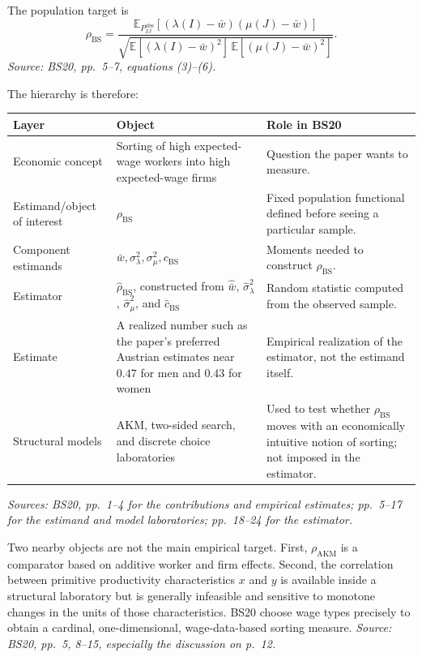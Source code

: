 \documentclass[11pt]{article}
\begin{document}
The population target is
\[
\rho_{\mathrm{BS}}
=
\frac{
\mathbb E_{P^{\mathrm{obs}}_{IJ}}
[(\lambda(I)-\bar w)(\mu(J)-\bar w)]
}{
\sqrt{
\mathbb E[(\lambda(I)-\bar w)^2]\,
\mathbb E[(\mu(J)-\bar w)^2]
}
}.
\tag{T2.3}
\]
\textit{Source: BS20, pp.\ 5--7, equations (3)--(6).}

The hierarchy is therefore:

\begin{longtable}{p{}p{}p{}}
\textbf{Layer} & \textbf{Object} & \textbf{Role in BS20} \\
\hline
Economic concept & Sorting of high expected-wage workers into high
expected-wage firms & Question the paper wants to measure. \\
Estimand/object of interest & \(\rho_{\mathrm{BS}}\) & Fixed population
functional defined before seeing a particular sample. \\
Component estimands & \(\bar w,\sigma_\lambda^2,\sigma_\mu^2,c_{\mathrm{BS}}\)
& Moments needed to construct \(\rho_{\mathrm{BS}}\). \\
Estimator & \(\widehat\rho_{\mathrm{BS}}\), constructed from
\(\widehat{\bar w}\), \(\widehat\sigma_\lambda^2\),
\(\widehat\sigma_\mu^2\), and \(\widehat c_{\mathrm{BS}}\) & Random statistic
computed from the observed sample. \\
Estimate & A realized number such as the paper's preferred Austrian estimates
near \(0.47\) for men and \(0.43\) for women & Empirical realization of the
estimator, not the estimand itself. \\
Structural models & AKM, two-sided search, and discrete choice laboratories &
Used to test whether \(\rho_{\mathrm{BS}}\) moves with an economically intuitive
notion of sorting; not imposed in the estimator. \\
\end{longtable}

\textit{Sources: BS20, pp.\ 1--4 for the contributions and empirical
estimates; pp.\ 5--17 for the estimand and model laboratories; pp.\ 18--24 for
the estimator.}

Two nearby objects are not the main empirical target.  First,
\(\rho_{\mathrm{AKM}}\) is a comparator based on additive worker and firm
effects.  Second, the correlation between primitive productivity
characteristics \(x\) and \(y\) is available inside a structural laboratory
but is generally infeasible and sensitive to monotone changes in the units of
those characteristics.  BS20 choose wage types precisely to obtain a cardinal,
one-dimensional, wage-data-based sorting measure.
\textit{Source: BS20, pp.\ 5, 8--15, especially the discussion on p.\ 12.}
\end{document}
